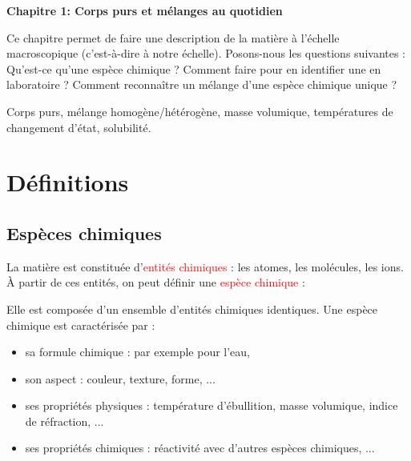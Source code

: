 
\renewcommand{\thesubsection}{\textcolor{red}{\Roman{section}.\arabic{subsection}}}
\renewcommand{\thesubsubsection}{\textcolor{red}{\Roman{section}.\arabic{subsection}.\alph{subsubsection}}}

\setcounter{section}{0}
\sndEnTeteCoursUn

\begin{center}
\begin{mdframed}[style=titr, leftmargin=60pt, rightmargin=60pt, innertopmargin=7pt, innerbottommargin=7pt, innerrightmargin=8pt, innerleftmargin=8pt]

\begin{center}
\large{\textbf{Chapitre 1: Corps purs et mélanges au quotidien}}
\end{center}

\end{mdframed}
\end{center}
Ce chapitre permet de faire une description de la matière à l'échelle macroscopique (c'est-à-dire à notre échelle). Posons-nous les questions suivantes : Qu'est-ce qu'une espèce chimique ? Comment faire pour en identifier une en laboratoire ? Comment reconnaître un mélange d'une espèce chimique unique ?
%
\begin{tcolorbox}[colback=blue!5!white,colframe=blue!75!black,title=Mots clés du chapitre :]
Corps purs, mélange homogène/hétérogène, masse volumique, températures de changement d'état, solubilité.
\end{tcolorbox}

%

\section{Définitions}

\subsection{Espèces chimiques}

La matière est constituée d'\textcolor{red}{entités chimiques} : les atomes, les molécules, les ions. \`{A} partir de ces entités, on peut définir une \textcolor{red}{espèce chimique} :
\begin{tcolorbox}[colback=green!5!white,colframe=green!75!black,title=\textbf{Espèce chimique}, ]
Elle est composée d'un ensemble d'entités chimiques identiques. Une espèce chimique est caractérisée par :
\begin{itemize}
    \item sa formule chimique : par exemple  pour l'eau,
    \item son aspect : couleur, texture, forme, ...
    \item ses propriétés physiques : température d'ébullition, masse volumique, indice de réfraction, ...
    \item ses propriétés chimiques : réactivité avec d'autres espèces chimiques, ... 
\end{itemize}

\end{tcolorbox}

